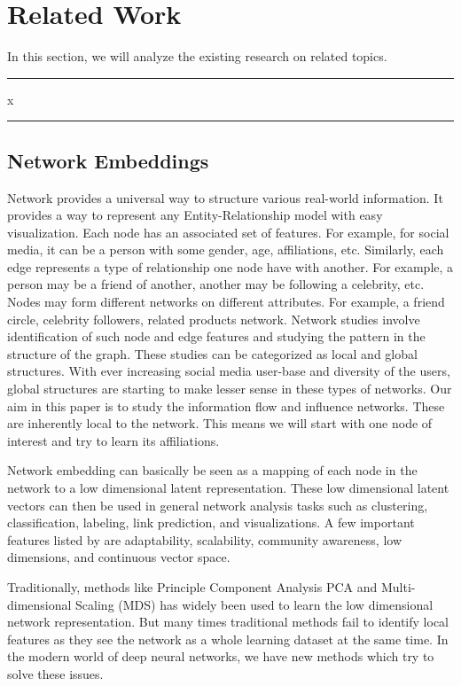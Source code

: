 
\section{Related Work}
\label{section_related}
In this section, we will analyze the existing research on related topics.


\hrule
x
\hrule


\subsection{Network Embeddings}
Network provides a universal way to structure various real-world information. It provides a way to represent any Entity-Relationship model with easy visualization. Each node has an associated set of features. For example, for social media, it can be a person with some gender, age, affiliations, etc. Similarly, each edge represents a type of relationship one node have with another. For example, a person may be a friend of another, another may be following a celebrity, etc. Nodes may form different networks on different attributes. For example, a friend circle, celebrity followers, related products network. Network studies involve identification of such node and edge features and studying the pattern in the structure of the graph. These studies can be categorized as local and global structures. With ever increasing social media user-base and diversity of the users, global structures are starting to make lesser sense in these types of networks. Our aim in this paper is to study the information flow and influence networks. These are inherently local to the network. This means we will start with one node of interest and try to learn its affiliations.

Network embedding can basically be seen as a mapping of each node in the network to a low dimensional latent representation. These low dimensional latent vectors can then be used in general network analysis tasks such as clustering, classification, labeling, link prediction, and visualizations. A few important features listed by \cite{chen2018tutorial} are adaptability, scalability, community awareness, low dimensions, and continuous vector space.

Traditionally, methods like Principle Component Analysis PCA \cite{krackhardt1988predicting} and Multi-dimensional Scaling (MDS) \cite{breiger1975algorithm} has widely been used to learn the low dimensional network representation. But many times traditional methods fail to identify local features as they see the network as a whole learning dataset at the same time. In the modern world of deep neural networks, we have new methods which try to solve these issues.

